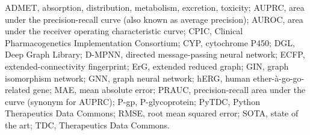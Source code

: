\documentclass[11pt]{article}
\begin{document}
ADMET, absorption, distribution, metabolism, excretion, toxicity; AUPRC, area under the precision-recall curve (also known as average precision); AUROC, area under the receiver operating characteristic curve; CPIC, Clinical Pharmacogenetics Implementation Consortium; CYP, cytochrome P450; DGL, Deep Graph Library; D-MPNN, directed message-passing neural network; ECFP, extended-connectivity fingerprint; ErG, extended reduced graph; GIN, graph isomorphism network; GNN, graph neural network; hERG, human ether-\`a-go-go-related gene; MAE, mean absolute error; PRAUC, precision-recall area under the curve (synonym for AUPRC); P-gp, P-glycoprotein; PyTDC, Python Therapeutics Data Commons; RMSE, root mean squared error; SOTA, state of the art; TDC, Therapeutics Data Commons.



\end{document}
